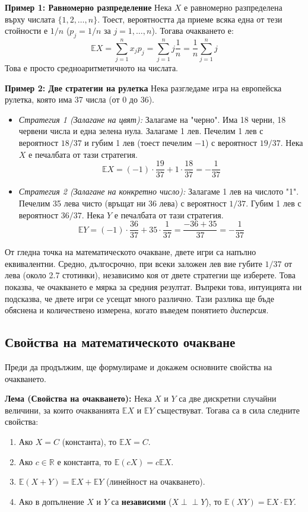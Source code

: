 \documentclass{article}
\begin{document}
\textbf{Пример 1: Равномерно разпределение}
Нека $X$ е равномерно разпределена върху числата $\{1, 2, \dots, n\}$. Тоест, вероятността да приеме всяка една от тези стойности е $1/n$ ($p_j = 1/n$ за $j=1,\dots,n$).
Тогава очакването е:
\[ \mathbb{E}X = \sum_{j=1}^n x_j p_j = \sum_{j=1}^n j \frac{1}{n} = \frac{1}{n} \sum_{j=1}^n j \]
Това е просто средноаритметичното на числата.

\textbf{Пример 2: Две стратегии на рулетка}
Нека разгледаме игра на европейска рулетка, която има 37 числа (от 0 до 36).
\begin{itemize}
    \item \textit{Стратегия 1 (Залагане на цвят):} Залагаме на "черно". Има 18 черни, 18 червени числа и една зелена нула. Залагаме 1 лев. Печелим 1 лев с вероятност $18/37$ и губим 1 лев (тоест печелим $-1$) с вероятност $19/37$. Нека $X$ е печалбата от тази стратегия. 
    \[ \mathbb{E}X = (-1) \cdot \frac{19}{37} + 1 \cdot \frac{18}{37} = -\frac{1}{37} \]
    
    \item \textit{Стратегия 2 (Залагане на конкретно число):} Залагаме 1 лев на числото "1". Печелим 35 лева чисто (връщат ни 36 лева) с вероятност $1/37$. Губим 1 лев с вероятност $36/37$. Нека $Y$ е печалбата от тази стратегия.
    \[ \mathbb{E}Y = (-1) \cdot \frac{36}{37} + 35 \cdot \frac{1}{37} = \frac{-36 + 35}{37} = -\frac{1}{37} \]
\end{itemize}

От гледна точка на математическото очакване, двете игри са напълно еквивалентни. Средно, дългосрочно, при всеки заложен лев вие губите $1/37$ от лева (около 2.7 стотинки), независимо коя от двете стратегии ще изберете. Това показва, че очакването е мярка за средния резултат. Въпреки това, интуицията ни подсказва, че двете игри се усещат много различно. Тази разлика ще бъде обяснена и количествено измерена, когато въведем понятието \textit{дисперсия}.

\subsection{Свойства на математическото очакване}

Преди да продължим, ще формулираме и докажем основните свойства на очакването.

\textbf{Лема (Свойства на очакването):} Нека $X$ и $Y$ са две дискретни случайни величини, за които очакванията $\mathbb{E}X$ и $\mathbb{E}Y$ съществуват. Тогава са в сила следните свойства:
\begin{enumerate}
    \item[а)] Ако $X = C$ (константа), то $\mathbb{E}X = C$.
    \item[б)] Ако $c \in \mathbb{R}$ е константа, то $\mathbb{E}(cX) = c\mathbb{E}X$.
    \item[в)] $\mathbb{E}(X + Y) = \mathbb{E}X + \mathbb{E}Y$ (линейност на очакването).
    \item[г)] Ако в допълнение $X$ и $Y$ са \textbf{независими} ($X \perp\!\!\!\perp Y$), то $\mathbb{E}(XY) = \mathbb{E}X \cdot \mathbb{E}Y$.
\end{enumerate}
\end{document}
